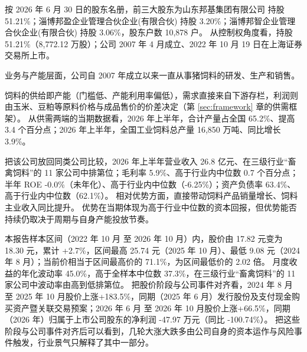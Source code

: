  按 2026 年 6 月 30 日的股东名册，前三大股东为山东邦基集团有限公司 持股 51.21\%；淄博邦盈企业管理合伙企业(有限合伙) 持股 3.20\%；淄博邦智企业管理合伙企业(有限合伙) 持股 3.06\%，股东户数 10,878 户。 从控制权角度看，持股 51.21\%（8,772.12 万股）；公司 2007 年 4 月成立、2022 年 10 月 19 日在上海证券交易所上市。

 业务与产能层面，公司自 2007 年成立以来一直从事猪饲料的研发、生产和销售。

 饲料的供给即产能（门槛低、产能利用率偏低），需求直接来自下游存栏，利润则由玉米、豆粕等原料价格与成品售价的价差决定（第 \ref{sec:framework} 章的供需框架）。 从供需两端的当期数据看，2026 年上半年，合计产量占全国 65.2\%、提高 3.4 个百分点；2026 年上半年，全国工业饲料总产量 16,850 万吨、同比增长 3.9\%。

 把该公司放回同类公司比较，2026 年上半年营业收入 26.8 亿元、在三级行业“畜禽饲料”的 11 家公司中排第位；毛利率 5.9\%、高于行业内中位数 0.7 个百分点；半年 ROE -0.0\%（未年化）、高于行业内中位数（-6.25\%）；资产负债率 63.4\%、高于行业内中位数（62.1\%）。 相对优势方面，直接带动饲料产品销量增长、饲料主业收入同比提升。 优势在当期体现为高于行业中位数的资本回报，但优势能否持续仍取决于周期与自身产能投放节奏。

 本报告样本区间（2022 年 10 月 至 2026 年 10 月）内，股价由 17.82 元变为 18.30 元，累计 +2.7\%，区间最高 25.74 元（2025 年 10 月）、最低 9.08 元（2024 年 8 月）；当前价相当于区间最高价的 71.1\%，为区间最低价的 2.02 倍。 月度收益的年化波动率 45.0\%，高于全样本中位数 37.3\%，在三级行业“畜禽饲料”的 11 家公司中波动率由高到低排第位。 把股价阶段与公司事件对齐看，2024 年 8 月 至 2025 年 10 月股价上涨+183.5\%，同期（2025 年 6 月）发行股份及支付现金购买资产暨关联交易预案；2026 年 6 月 至 2026 年 10 月股价上涨+66.5\%，同期（2026 年）归属于上市公司股东的净利润 -47.97 万元（同比 -100.74\%）。 把这些阶段与公司事件对齐后可以看到，几轮大涨大跌多由公司自身的资本运作与风险事件触发，行业景气只解释了其中一部分。

